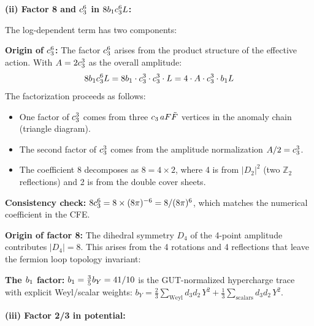 \textbf{(ii) Factor 8 and $c_3^6$ in $8b_1c_3^6 L$:}

The log-dependent term has two components:

\textbf{Origin of $c_3^6$:} The factor $c_3^6$ arises from the product structure 
of the effective action. With $A = 2c_3^3$ as the overall amplitude:
\begin{equation}
    8b_1c_3^6 L = 8b_1 \cdot c_3^3 \cdot c_3^3 \cdot L
    = 4 \cdot A \cdot c_3^3 \cdot b_1 L
\end{equation}
The factorization proceeds as follows:
\begin{itemize}[leftmargin=1.5em, topsep=2pt, itemsep=1pt]
    \item One factor of $c_3^3$ comes from three $c_3\, aF\tilde{F}$ vertices 
        in the anomaly chain (triangle diagram).
    \item The second factor of $c_3^3$ comes from the amplitude normalization $A/2 = c_3^3$.
    \item The coefficient 8 decomposes as $8 = 4 \times 2$, where 4 is from $|D_2|^2$ 
        (two $\mathbb{Z}_2$ reflections) and 2 is from the double cover sheets.
\end{itemize}
\textbf{Consistency check:} $8c_3^6 = 8 \times (8\pi)^{-6} = 8/(8\pi)^6$, which matches 
the numerical coefficient in the CFE.

\textbf{Origin of factor 8:} The dihedral symmetry $D_4$ of the 4-point amplitude 
contributes $|D_4| = 8$. This arises from the 4 rotations and 4 reflections that 
leave the fermion loop topology invariant:
\begin{center}
\end{center}

\textbf{The $b_1$ factor:} $b_1 = \frac{3}{5}b_Y = 41/10$ is the GUT-normalized
hypercharge trace with explicit Weyl/scalar weights:
$b_Y=\frac{2}{3}\sum_{\text{Weyl}} d_3 d_2\,Y^2+\frac{1}{3}\sum_{\text{scalars}} d_3 d_2\,Y^2$.

\textbf{(iii) Factor 2/3 in potential:}

